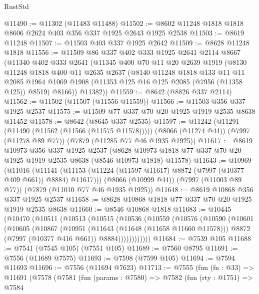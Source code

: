 \begin{lexlean}{RustStd}
\begin{coremodule}
{\begin{coremodule}
{{{{{{{{{{{{{{{{{{{{{{{{{{{{{{{{{{{{{{{{{{{@11490 := @11302 (@11483 @11488)
@11502 := @8602 @11248 @1818 @1818 @8606 @2624 @403 @356 @337 @1925 @2643 @1925 @2538
@11503 := @8619 @11248
@11507 := @11503 @403 @337 @1925 @2642
@11509 := @8628 @11248 @1818
@11556 := @11509
    @86
    @337
    @402
    @333
    @1925
    @2641
    @2114
    @8667
    (@11340
      @402
      @333
      @2641
      (@11345
        @400
        @70
        @11
        @20
        @2639
        @1919
        (@8130
          @11248
          @1818
          @400
          @11
          @2635
          @2637
          (@8140
            @11248
            @1818
            @133
            @11
            @11
            @2085
            @1964
            @1069
            @1908
            (@11353 @125 @16 @125 @2085 (@7956 (@11358 @125)) @8519)
            @8166))
        @11382))
@11559 := @8642 (@8826 @337 @2114)
@11562 := @11502 (@11507 (@11556 @11559))
@11566 := @11503 @356 @337 @1925 @2537
@11575 := @11509 @77 @337 @70 @20 @1925 @1919 @2535 @8638 @11452
@11578 := @8642 (@8645 @337 @2535)
@11597 := @11242
    (@11291 (@11490 (@11562 (@11566 (@11575 @11578)))))
    (@8066 (@11274 @44))
    (@7997 (@11278 @89 @77))
    (@7879 (@11285 @77 @46 @1935 @1925))
@11617 := @8619
    @10973
    @356
    @337
    @1925
    @2537
    (@8628 @10973 @1818 @77 @337 @70 @20 @1925 @1919 @2535 @8638 (@8546 @10973 @1818) @11578)
@11643 := @10969
    (@11016
      (@11141 (@11153 (@11224 (@11597 @11617) @8872 (@7997 (@10377 @409 @661)) @8884) @11617)))
    (@8066 (@10999 @44))
    (@7997 (@11003 @89 @77))
    (@7879 (@11010 @77 @46 @1935 @1925))
@11648 := @8619 @10868 @356 @337 @1925 @2537
@11658 := @8628 @10868 @1818 @77 @337 @70 @20 @1925 @1919 @2535 @8638
@11660 := @8546 @10868 @1818
@11683 := @10445
    (@10470
      (@10511
        (@10513
          (@10515
            (@10536
              (@10559
                (@10576
                  (@10590
                    (@10601
                      (@10605
                        (@10867
                          (@10951
                            (@11643 (@11648 (@11658 @11660 @11578)))
                            @8872
                            (@7997 (@10377 @416 @661))
                            @8884))))))))))))
@11684 := @7539 @105
@11688 := @7541 (@7545 @105) (@7551 @105)
@11689 := @7560 @8795
@11691 := @7556 (@11689 @7575)
@11693 := @7598 (@7599 @105)
@11694 := @7594 @11693
@11696 := @7556 (@11694 @7623)
@11713 := @7555
    (fun (fn : @33) =>
    @11691
      (@7578
        (@7581
          (fun (params : @7580) =>
          @7582
            (fun (rty : @1751) =>
            @7584
}}}}}}}}}}}}}}}}}}}}}}}}}}}}}}}}}}}}}}}}}}}
\end{coremodule}}
\end{coremodule}
\end{lexlean}
